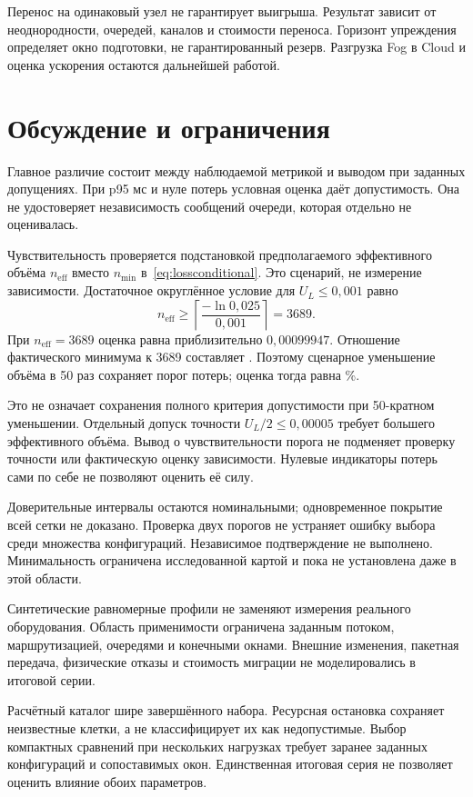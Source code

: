\documentclass{psta}
\begin{document}
Перенос на одинаковый узел не гарантирует выигрыша. Результат зависит от неоднородности, очередей, каналов и стоимости переноса. Горизонт упреждения определяет окно подготовки, не гарантированный резерв. Разгрузка Fog в Cloud и оценка ускорения остаются дальнейшей работой.

\section{Обсуждение и ограничения}\label{sec:limitations}
Главное различие состоит между наблюдаемой метрикой и выводом при заданных допущениях. При p95 \dQ{} мс и нуле потерь условная оценка даёт допустимость. Она не удостоверяет независимость сообщений очереди, которая отдельно не оценивалась.

Чувствительность проверяется подстановкой предполагаемого эффективного объёма $n_{\mathrm{eff}}$ вместо $n_{\min}$ в~\eqref{eq:lossconditional}. Это сценарий, не измерение зависимости. Достаточное округлённое условие для $U_L\leq0{,}001$ равно
\begin{equation}\label{eq:zero}
 n_{\mathrm{eff}}\geq\left\lceil\frac{-\ln0{,}025}{0{,}001}\right\rceil=3689.
\end{equation}
При $n_{\mathrm{eff}}=3689$ оценка равна приблизительно $0{,}00099947$. Отношение фактического минимума к 3689 составляет \cReduction{}. Поэтому сценарное уменьшение объёма в 50 раз сохраняет порог потерь; оценка тогда равна \cFiftyBound{}\%.

Это не означает сохранения полного критерия допустимости при 50-кратном уменьшении. Отдельный допуск точности $U_L/2\leq0{,}00005$ требует большего эффективного объёма. Вывод о чувствительности порога не подменяет проверку точности или фактическую оценку зависимости. Нулевые индикаторы потерь сами по себе не позволяют оценить её силу.

Доверительные интервалы остаются номинальными; одновременное покрытие всей сетки не доказано. Проверка двух порогов не устраняет ошибку выбора среди множества конфигураций. Независимое подтверждение не выполнено. Минимальность ограничена исследованной картой и пока не установлена даже в этой области.

Синтетические равномерные профили не заменяют измерения реального оборудования. Область применимости ограничена заданным потоком, маршрутизацией, очередями и конечными окнами. Внешние изменения, пакетная передача, физические отказы и стоимость миграции не моделировались в итоговой серии.

Расчётный каталог шире завершённого набора. Ресурсная остановка сохраняет неизвестные клетки, а не классифицирует их как недопустимые. Выбор компактных сравнений при нескольких нагрузках требует заранее заданных конфигураций и сопоставимых окон. Единственная итоговая серия не позволяет оценить влияние обоих параметров.
\end{document}

